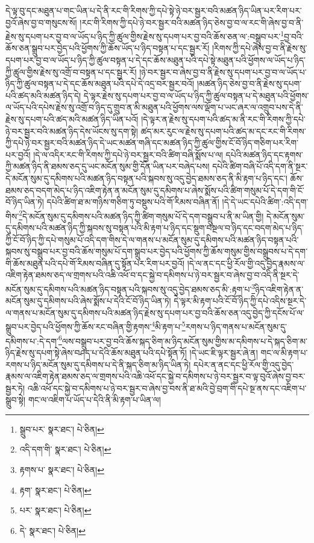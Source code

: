 དེ་ལྟ་བུ་དང་མཐུན་པ་གང་ཡིན་པ་དེ་ནི་རང་གི་རིགས་ཀྱི་དཔེ་སྟེ་ཉེ་བར་སྦྱར་བའི་མཚན་ཉིད་ཡིན་པར་རིག་པར་བྱའོ་ཞེས་བྱ་བ་གསུངས་སོ། །རང་གི་རིགས་ཀྱི་དཔེ་ཉེ་བར་སྦྱར་བའི་མཚན་ཉིད་ཅེས་བྱ་བ་ལ་རང་གི་ཞེས་བྱ་བ་ནི་རྗེས་སུ་དཔག་པར་བྱ་བ་ལ་ཡོད་པ་ཉིད་ཀྱི་ཚུལ་གྱིས་རྗེས་སུ་དཔག་པར་བྱ་བའི་ཆོས་ཅན་ལ་:བསྒྲུབ་པར་\footnote{སྒྲུབ་པར་  སྣར་ཐང་།  པེ་ཅིན། }བྱ་བའི་ཆོས་ཅན་སྒྲུབ་པར་བྱེད་པའི་ཕྱོགས་ཀྱི་ཆོས་ཡོད་པ་ཉིད་བསྟན་པ་དང་སྦྱར་རོ། །རིགས་ཀྱི་དཔེ་ཞེས་བྱ་བ་ནི་རྗེས་སུ་དཔག་པར་བྱ་བ་ལ་ཡོད་པ་ཉིད་ཀྱི་ཚུལ་བསྟན་པ་དེ་དང་ཆོས་མཐུན་པའི་དཔེ་སྟེ་མཐུན་པའི་ཕྱོགས་ལ་ཡོད་པ་ཉིད་ཀྱི་ཚུལ་གྱིས་རྗེས་སུ་འགྲོ་བ་བསྟན་པ་དང་སྦྱར་རོ། །ཉེ་བར་སྦྱར་བ་ཞེས་བྱ་བ་ནི་རྗེས་སུ་དཔག་པར་བྱ་བ་ལ་ཡོད་པ་ཉིད་ཀྱི་ཚུལ་བསྟན་པ་དེ་དང་ཆོས་མཐུན་པའི་དཔེ་དེ་འདྲ་བར་སྦྱར་བའོ། །མཚན་ཉིད་ཅེས་བྱ་བ་ནི་རྗེས་སུ་དཔག་པའི་ཚད་མའི་མཚན་ཉིད་དེ། དེ་ལྟར་རྗེས་སུ་དཔག་པར་བྱ་བ་ལ་ཡོད་པ་ཉིད་ཀྱི་ཚུལ་བསྟན་པ་དེ་མཐུན་པའི་ཕྱོགས་ལ་ཡོད་པའི་དཔེས་རྗེས་སུ་འགྲོ་བ་ཉིད་དུ་གྲུབ་ན་མི་མཐུན་པའི་ཕྱོགས་ལས་ལྡོག་པ་ཡང་ཞར་ལ་འགྲུབ་པས་དེ་ནི་རྗེས་སུ་དཔག་པའི་ཚད་མའི་མཚན་ཉིད་ཡིན་པའོ། །དེ་ལྟར་ན་རྗེས་སུ་དཔག་པའི་ཚད་མ་ནི་རང་གི་རིགས་ཀྱི་དཔེ་ཉེ་བར་སྦྱར་བའི་མཚན་ཉིད་དེས་ཡོངས་སུ་དག་སྟེ། ཚད་མར་རུང་ལ་རྗེས་སུ་དཔག་པའི་ཚད་མ་དང་རང་གི་རིགས་ཀྱི་དཔེ་ཉེ་བར་སྦྱར་བའི་མཚན་ཉིད་དེ་ཡང་མཚན་གཞི་དང་མཚན་ཉིད་ཀྱི་ཚུལ་གྱིས་ངོ་བོ་ཉིད་གཅིག་པར་རིག་པར་བྱའོ། །དེ་ལ་འདིར་རང་གི་རིགས་ཀྱི་དཔེ་ཉེ་བར་སྦྱར་བའི་ཚིག་བཞི་སྨོས་པ་ལ། དཔེའི་མཚན་ཉིད་དང་རྟགས་ཀྱི་མཚན་ཉིད་ནི་ཐམས་ཅད་དུ་ཡང་མངོན་སུམ་གྱི་དོན་ཡིན་པར་བཞེད་པས། དཔེའི་ཚིག་བཞི་པོ་འདི་དག་ནི་སྔར་དེ་མངོན་སུམ་དུ་དམིགས་པའི་མཚན་ཉིད་བསྟན་པའི་སྐབས་སུ་འདུ་བྱེད་ཐམས་ཅད་ནི་མི་རྟག་པ་ཉིད་དང་། ཆོས་ཐམས་ཅད་བདག་མེད་པ་ཉིད་འཇིག་རྟེན་ན་མངོན་སུམ་དུ་དམིགས་པ་ཞེས་སྨོས་པའི་ཚིག་གསུམ་པོ་དེ་དག་གི་ངོ་བོ་ཉིད་ཡིན་ཏེ། དཔེའི་ཚིག་ཐ་མ་གཉིས་གཅིག་ཏུ་བསྡུས་པའི་གོ་རིམས་བཞིན་ནོ། །དེ་དེ་ཡང་དཔེའི་ཚིག་:འདི་དག་གིས་\footnote{འདི་དག་གི་  སྣར་ཐང་།  པེ་ཅིན། }དེ་མངོན་སུམ་དུ་དམིགས་པའི་མཚན་ཉིད་ཀྱི་ཚིག་གསུམ་པོ་དེ་དག་བསྒྲུབ་པ་ནི་མ་ཡིན་གྱི། དེ་མངོན་སུམ་དུ་དམིགས་པའི་མཚན་ཉིད་ཀྱི་སྐབས་སུ་བསྟན་པའི་མི་རྟག་པ་ཉིད་དང་སྡུག་བསྔལ་བ་ཉིད་དང་བདག་མེད་པ་ཉིད་ཀྱི་ངོ་བོ་ཉིད་ཀྱི་དཔེ་གསུམ་པོ་འདི་དག་གིས་དེ་ལ་གནས་པ་མངོན་སུམ་དུ་དམིགས་པའི་མཚན་ཉིད་བསྟན་པའི་སྐབས་སུ་བསྒྲུབ་པར་བྱ་བའི་ཆོས་གསུམ་པོ་དག་སྒྲུབ་པར་བྱེད་པའི་ཕྱོགས་ཀྱི་ཆོས་གསུམ་གྱིས་བསྒྲུབས་པ་དེ་དག་གི་ཆོས་མཐུན་པའི་དཔེ་གོ་རིམས་བཞིན་དུ་སྟོན་པར་རིག་པར་བྱའོ། །དེ་ལ་ནང་དང་ཕྱི་རོལ་གྱི་འདུ་བྱེད་རྣམས་ལ་འཇིག་རྟེན་ཐམས་ཅད་ལ་གྲགས་པའི་འཆི་འཕོ་བ་དང་སྐྱེ་བ་དམིགས་པ་ཉེ་བར་སྦྱར་བ་ཞེས་བྱ་བ་འདི་ནི་སྔར་དེ་མངོན་སུམ་དུ་དམིགས་པའི་མཚན་ཉིད་བསྟན་པའི་སྐབས་སུ་འདུ་བྱེད་ཐམས་ཅད་མི་:རྟག་པ་\footnote{རྟགས་པ་  སྣར་ཐང་།  པེ་ཅིན། }ཉིད་འཇིག་རྟེན་ན་མངོན་སུམ་དུ་དམིགས་པའི་ཞེས་སྨོས་པ་དེའི་ངོ་བོ་ཉིད་ཡིན་ཏེ། དེ་ལྟར་མི་རྟག་པའི་ངོ་བོ་ཉིད་ཀྱི་དཔེ་འདིས་སྔར་དེ་ལ་གནས་པ་མངོན་སུམ་དུ་དམིགས་པའི་མཚན་ཉིད་རྗེས་སུ་དཔག་པར་བྱ་བའི་ཆོས་ཅན་འདུ་བྱེད་ཀྱི་དངོས་པོ་ལ་སྒྲུབ་པར་བྱེད་པའི་ཕྱོགས་ཀྱི་ཆོས་རང་བཞིན་གྱི་རྟགས་\footnote{རྟག་  སྣར་ཐང་།  པེ་ཅིན། }མི་རྟག་པ་\footnote{པར་  སྣར་ཐང་།  པེ་ཅིན། }རགས་པ་ཉིད་གནས་པ་མངོན་སུམ་དུ་དམིགས་པ་:དེ་དག་\footnote{དེ་  སྣར་ཐང་།  པེ་ཅིན། }ལས་བསྒྲུབ་པར་བྱ་བའི་ཆོས་སྐད་ཅིག་མ་ཉིད་མངོན་སུམ་གྱིས་མ་དམིགས་པ་དེ་སྐད་ཅིག་མ་ཉིད་རྗེས་སུ་དཔག་སྟེ་ཞེས་བཤད་པ་དེའི་ཆོས་མཐུན་པའི་དཔེ་སྟོན་ཏོ། །དེ་ཡང་ཇི་ལྟར་སྦྱར་ཞེ་ན། གང་ལ་མི་རྟག་པ་རགས་པ་ཉིད་མངོན་སུམ་དུ་དམིགས་པ་དེ་ནི་སྐད་ཅིག་མ་ཉིད་ཡིན་ཏེ། དཔེར་ན་ནང་དང་ཕྱི་རོལ་གྱི་འདུ་བྱེད་རྣམས་ལ་འཇིག་རྟེན་ཐམས་ཅད་ལ་གྲགས་པའི་འཆི་འཕོ་དང་སྐྱེ་བ་དམིགས་པ་ཉེ་བར་སྦྱར་བ་ལྟ་བུའོ་ཞེས་བྱ་བར་སྦྱར་ཏེ། འཆི་འཕོ་དང་སྐྱེ་བ་དམིགས་པ་ཉེ་བར་སྦྱར་བ་ཞེས་བྱ་བས་ནི་ཐ་མའི་བྱེ་བྲག་གི་དཔེ་སྔ་ནས་དང་འཇིག་པ་སྒྲུབ་སྟེ། གང་ལ་འཇིག་པ་ཡོད་པ་དེའི་ནི་མི་རྟག་པ་ཡིན་ལ། 